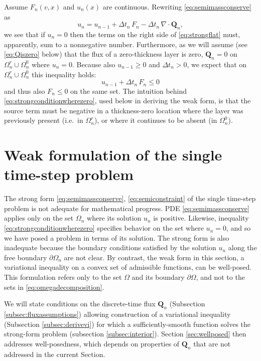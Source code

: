 \documentclass[final,leqno,onefignum,onetabnum]{siamltex1213bueler}
\newcommand\bQ{\mathbf{Q}}
\newcommand{\Div}{\nabla\cdot}
\begin{document}
Assume $F_n(v,x)$ and $u_n(x)$ are continuous.  Rewriting \eqref{eq:semimassconserve} as
\begin{equation}
u_n = u_{n-1} + \Delta t_n\, F_n - \Delta t_n\, \Div \bQ_n,  \label{eq:strongflat}
\end{equation}
we see that if $u_n=0$ then the terms on the right side of \eqref{eq:strongflat} must, apparently, sum to a nonnegative number.  Furthermore, as we will assume (see \eqref{eq:Qiszero} below) that the flux of a zero-thickness layer is zero, $\bQ_n=0$ on $\Omega_n^r \cup \Omega_n^0$ where $u_n=0$.  Because also $u_{n-1}\ge 0$ and $\Delta t_n > 0$, we expect that on $\Omega_n^r \cup \Omega_n^0$ this inequality holds:
\begin{equation}
u_{n-1} + \Delta t_n\, F_n \le 0 \label{eq:strongconditionwherezero}
\end{equation}
and thus also $F_n \le 0$ on the same set.  The intuition behind \eqref{eq:strongconditionwherezero}, used below in deriving the weak form, is that the source term must be negative in a thickness-zero location where the layer was previously present (i.e.~in $\Omega_n^r$), or where it continues to be absent (in $\Omega_n^0$).


\section{Weak formulation of the single time-step problem}  \label{sec:weakform}

The strong form \eqref{eq:semimassconserve}, \eqref{eq:semiconstraint} of the single time-step problem is not adequate for mathematical progress.  PDE \eqref{eq:semimassconserve} applies only on the set $\Omega_n$ where its solution $u_n$ is positive.  Likewise, inequality \eqref{eq:strongconditionwherezero} specifies behavior on the set where $u_n=0$, and so we have posed a problem in terms of its solution.  The strong form is also inadequate because the boundary conditions satisfied by the solution $u_n$ along the free boundary $\partial\Omega_n$ are not clear.  By contrast, the weak form in this section, a variational inequality \cite{Friedman1982,KinderlehrerStampacchia1980} on a convex set of admissible functions, can be well-posed.  This formulation refers only to the set $\Omega$ and its boundary $\partial\Omega$, and not to the sets in \eqref{eq:omegadecomposition}.

We will state conditions on the discrete-time flux $\bQ_n$ (Subsection \ref{subsec:fluxassumptions}) allowing construction of a variational inequality (Subsection \ref{subsec:derivevi}) for which a sufficiently-smooth function solves the strong-form problem (subsection \ref{subsec:interior}).  Section \ref{sec:wellposed} then addresses well-posedness, which depends on properties of $\bQ_n$ that are not addressed in the current Section.
\end{document}
